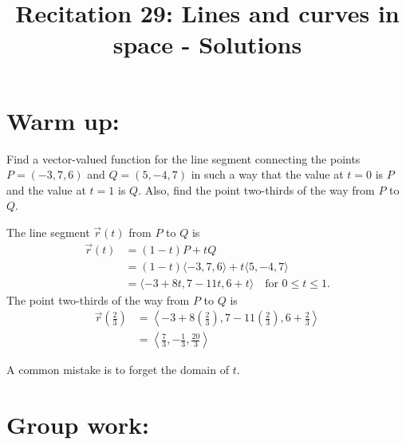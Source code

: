 \documentclass[noinstructornotes]{ximera}
\title{Recitation 29: Lines and curves in space - Solutions}
\begin{document}
\begin{abstract}		\end{abstract}
\maketitle



\section{Warm up:}
Find a vector-valued function for the line segment connecting the points $P = (-3,7,6)$ and $Q = (5,-4,7)$ in such a way that the value at $t=0$ is $P$ and the value at $t=1$ is $Q$.  
Also, find the point two-thirds of the way from $P$ to $Q$.
	\begin{freeResponse}
	The line segment $\vec{r}(t)$ from $P$ to $Q$ is 
		\begin{align*}
		\vec{r}(t) &= (1-t)P + tQ  \\
		&= (1-t) \langle -3,7,6 \rangle + t \langle 5,-4,7 \rangle  \\
		&= \boxed{\langle -3 + 8t, 7 - 11t, 6 + t \rangle \quad \text{for }0 \leq t \leq 1}.
		\end{align*}
	The point two-thirds of the way from $P$ to $Q$ is
		\begin{align*}
		\vec{r} \left( \frac{2}{3} \right)
		&= \left\langle -3 + 8 \left( \frac{2}{3} \right), 7 - 11\left( \frac{2}{3} \right), 6 + \frac{2}{3} \right\rangle  \\
		&= \boxed{\left\langle \frac{7}{3} , - \frac{1}{3}, \frac{20}{3} \right\rangle}
		\end{align*}
	\end{freeResponse}
	
\begin{instructorNotes}
A common mistake is to forget the domain of $t$. 
\end{instructorNotes}







\section{Group work:}
\end{document}

